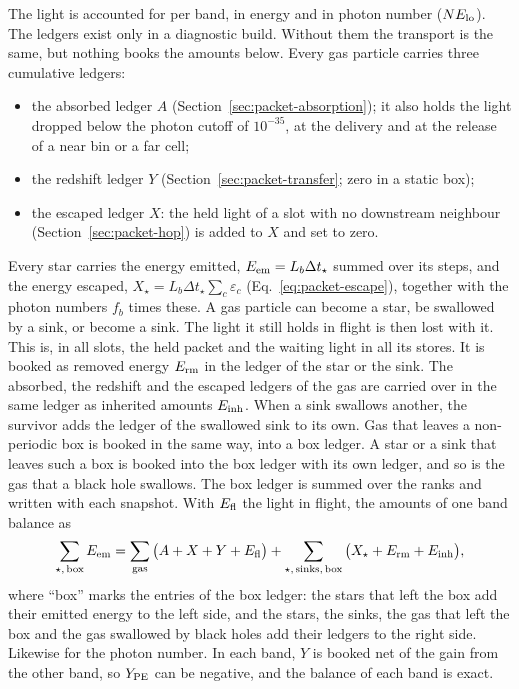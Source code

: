 The light is accounted for per band, in energy and in photon number
($N E_{\rm lo}$). The ledgers exist only in a diagnostic build. Without them
the transport is the same, but nothing books the amounts below. Every gas particle carries three
cumulative ledgers:
\begin{itemize}
  \item the absorbed ledger $A$ (Section~\ref{sec:packet-absorption}); it
    also holds the light dropped below the photon cutoff of $10^{-35}$, at
    the delivery and at the release of a near bin or a far cell;
  \item the redshift ledger $Y$ (Section~\ref{sec:packet-transfer}; zero in a
    static box);
  \item the escaped ledger $X$: the held light of a slot with no downstream
    neighbour (Section~\ref{sec:packet-hop}) is added to $X$ and set to zero.
\end{itemize}
Every star carries the energy emitted, $E_{\rm em}=L_b\Delta t_\star$ summed
over its steps, and the energy escaped,
$X_\star=L_b\Delta t_\star\sum_c\varepsilon_c$ (Eq.~\eqref{eq:packet-escape}),
together with the photon numbers $f_b$ times these. A gas particle can become
a star, be swallowed by a sink, or become a sink. The light it still holds in
flight is then lost with it. This is, in all slots, the held packet and the
waiting light in all its stores. It is booked as removed energy $E_{\rm rm}$ in the ledger
of the star or the sink. The absorbed, the redshift and the escaped ledgers of
the gas are carried over in the same ledger as inherited amounts
$E_{\rm inh}$. When a sink
swallows another, the survivor adds the ledger of the swallowed sink to its
own. Gas that leaves a non-periodic box is booked in the same way, into a
box ledger. A star or a sink that leaves such a box is booked into the box
ledger with its own ledger, and so is the gas that a black hole swallows. The
box ledger is summed over the ranks and written with each snapshot. With
$E_{\rm fl}$ the light in flight, the amounts of one band balance as
\begin{equation}
  \sum_{\star,\,{\rm box}} E_{\rm em} =
  \sum_{\rm gas}\big(A+X+Y+E_{\rm fl}\big) + \sum_{\star,\,{\rm sinks},\,{\rm box}}\big(X_\star + E_{\rm rm} + E_{\rm inh}\big),
  \label{eq:packet-balance}
\end{equation}
where ``box'' marks the entries of the box ledger: the stars that left the box
add their emitted energy to the left side, and the stars, the sinks, the gas
that left the box and the gas swallowed by black holes add their ledgers to
the right side. Likewise for the photon number. In each band, $Y$ is booked net of the gain
from the other band, so $Y_{\rm PE}$ can be negative, and the balance of each
band is exact.


